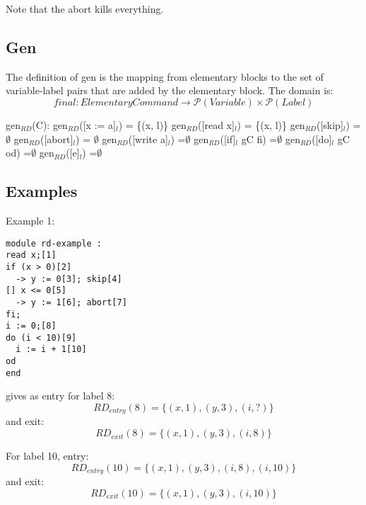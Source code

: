 Note that the abort kills everything.

\subsection{Gen}

The definition of gen is the mapping from elementary blocks to the set of variable-label pairs
that are added by the elementary block. The domain is:
\[final \colon Elementary Command \to \mathcal{P}(Variable)\times\mathcal{P}(Label)\]

gen$_{RD}$(C):\newline
gen$_{RD}$([x := a]$_l$)           = \{(x, l)\}\newline
gen$_{RD}$([read x]$_l$)           = \{(x, l)\}\newline
gen$_{RD}$([skip]$_l$)             =$\emptyset$\newline
gen$_{RD}$([abort]$_l$) 			= $\emptyset$\newline
gen$_{RD}$([write a]$_l$)          =$\emptyset$\newline
gen$_{RD}$([if]$_l$ gC fi)         =$\emptyset$\newline
gen$_{RD}$([do]$_l$ gC od)         =$\emptyset$\newline
gen$_{RD}$([e]$_l$)                =$\emptyset$\newline

\subsection{Examples}

Example 1:

\begin{lstlisting}
module rd-example :
read x;[1]
if (x > 0)[2]
  -> y := 0[3]; skip[4]
[] x <= 0[5]
  -> y := 1[6]; abort[7]
fi;
i := 0;[8]
do (i < 10)[9]
  i := i + 1[10]
od
end
\end{lstlisting}
gives as entry for label 8:
\[RD_{entry}(8) = \{(x, 1), (y, 3), (i, ?)\}\]
and exit:
\[RD_{exit}(8) = \{(x, 1), (y, 3), (i, 8)\}\]

For label 10, entry:
\[RD_{entry}(10) = \{(x, 1), (y, 3), (i, 8), (i, 10)\}\]
and exit:
\[RD_{exit}(10) = \{(x, 1), (y, 3), (i, 10)\}\]



